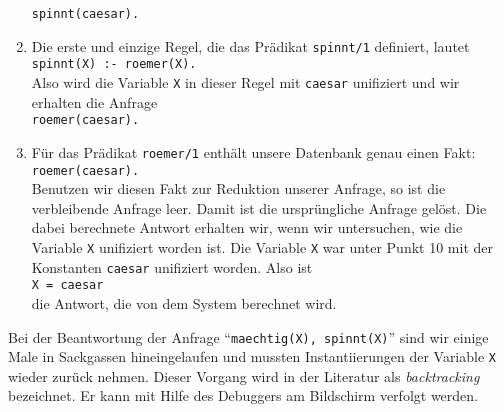 \begin{enumerate}
      \texttt{spinnt(caesar).}
\item Die erste und einzige Regel, die das Pr\"{a}dikat \texttt{spinnt/1} definiert,
      lautet \\[0.2cm]
      \hspace*{1.3cm} 
      \texttt{spinnt(X) :- roemer(X).} \\[0.2cm]
      Also wird die Variable \texttt{X} in dieser Regel mit \texttt{caesar} 
      unifiziert und wir erhalten die Anfrage \\[0.2cm]
      \hspace*{1.3cm} 
      \texttt{roemer(caesar).}
\item F\"{u}r das Pr\"{a}dikat \texttt{roemer/1} enth\"{a}lt unsere Datenbank genau einen Fakt:\\[0.2cm]
      \hspace*{1.3cm} \texttt{roemer(caesar).}  \\[0.2cm]
      Benutzen wir diesen Fakt zur Reduktion unserer Anfrage, so ist die verbleibende
      Anfrage leer.  Damit ist die urspr\"{u}ngliche Anfrage gel\"{o}st.  Die dabei berechnete
      Antwort erhalten wir, wenn wir untersuchen, wie die Variable \texttt{X} unifiziert
      worden ist.  Die Variable \texttt{X} war unter Punkt 10 mit der Konstanten
      \texttt{caesar} unifiziert worden.  Also ist \\[0.2cm]
      \hspace*{1.3cm} \texttt{X = caesar}
      \\[0.2cm]
      die Antwort, die von dem System berechnet wird.
\end{enumerate}
Bei der Beantwortung der Anfrage ``\texttt{maechtig(X), spinnt(X)}'' sind wir einige Male
in Sackgassen hineingelaufen und mussten Instantiierungen der Variable \texttt{X} wieder
zur\"{u}ck nehmen.  Dieser Vorgang wird in der Literatur als \emph{backtracking} bezeichnet.
Er kann mit Hilfe des Debuggers am Bildschirm verfolgt werden.

